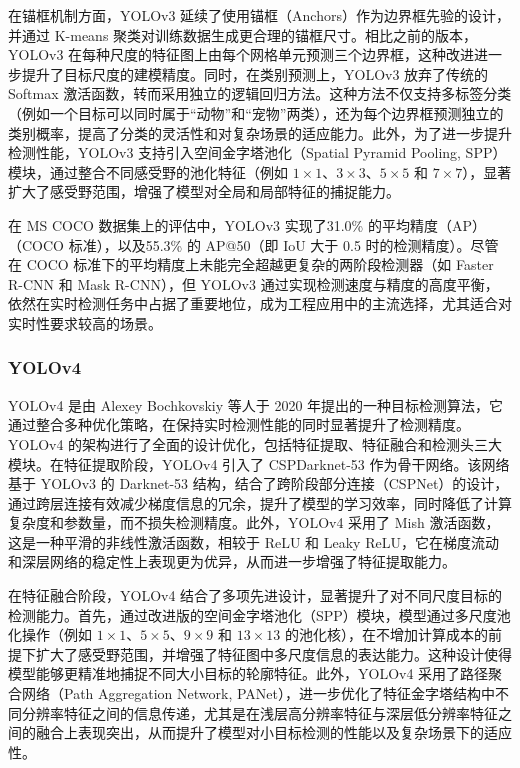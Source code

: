 \documentclass[11pt,twocolumn]{ctexart}
\begin{document}
在锚框机制方面，YOLOv3 延续了使用锚框（Anchors）作为边界框先验的设计，并通过 K-means 聚类对训练数据生成更合理的锚框尺寸。相比之前的版本，YOLOv3 在每种尺度的特征图上由每个网格单元预测三个边界框，这种改进进一步提升了目标尺度的建模精度。同时，在类别预测上，YOLOv3 放弃了传统的 Softmax 激活函数，转而采用独立的逻辑回归方法。这种方法不仅支持多标签分类（例如一个目标可以同时属于“动物”和“宠物”两类），还为每个边界框预测独立的类别概率，提高了分类的灵活性和对复杂场景的适应能力。此外，为了进一步提升检测性能，YOLOv3 支持引入空间金字塔池化（Spatial Pyramid Pooling, SPP）\cite{he2015spatial}模块，通过整合不同感受野的池化特征（例如 $1\times1$、$3\times3$、$5\times5$ 和 $7\times7$），显著扩大了感受野范围，增强了模型对全局和局部特征的捕捉能力。

在 MS COCO 数据集上的评估中，YOLOv3 实现了31.0\% 的平均精度（AP）（COCO 标准），以及55.3\% 的 AP@50（即 IoU 大于 0.5 时的检测精度）。尽管在 COCO 标准下的平均精度上未能完全超越更复杂的两阶段检测器（如 Faster R-CNN 和 Mask R-CNN），但 YOLOv3 通过实现检测速度与精度的高度平衡，依然在实时检测任务中占据了重要地位，成为工程应用中的主流选择，尤其适合对实时性要求较高的场景。
\subsubsection{YOLOv4}
YOLOv4\cite{bochkovskiy2020yolov4} 是由 Alexey Bochkovskiy 等人于 2020 年提出的一种目标检测算法，它通过整合多种优化策略，在保持实时检测性能的同时显著提升了检测精度。YOLOv4 的架构进行了全面的设计优化，包括特征提取、特征融合和检测头三大模块。在特征提取阶段，YOLOv4 引入了 CSPDarknet-53 作为骨干网络。该网络基于 YOLOv3 的 Darknet-53 结构，结合了跨阶段部分连接（CSPNet）的设计，通过跨层连接有效减少梯度信息的冗余，提升了模型的学习效率，同时降低了计算复杂度和参数量，而不损失检测精度。此外，YOLOv4 采用了 Mish 激活函数，这是一种平滑的非线性激活函数，相较于 ReLU 和 Leaky ReLU，它在梯度流动和深层网络的稳定性上表现更为优异，从而进一步增强了特征提取能力。

在特征融合阶段，YOLOv4 结合了多项先进设计，显著提升了对不同尺度目标的检测能力。首先，通过改进版的空间金字塔池化（SPP）模块，模型通过多尺度池化操作（例如 $1\times1$、$5\times5$、$9\times9$ 和 $13\times13$ 的池化核），在不增加计算成本的前提下扩大了感受野范围，并增强了特征图中多尺度信息的表达能力。这种设计使得模型能够更精准地捕捉不同大小目标的轮廓特征。此外，YOLOv4 采用了路径聚合网络（Path Aggregation Network, PANet）\cite{liu2018path}，进一步优化了特征金字塔结构中不同分辨率特征之间的信息传递，尤其是在浅层高分辨率特征与深层低分辨率特征之间的融合上表现突出，从而提升了模型对小目标检测的性能以及复杂场景下的适应性。
\end{document}
